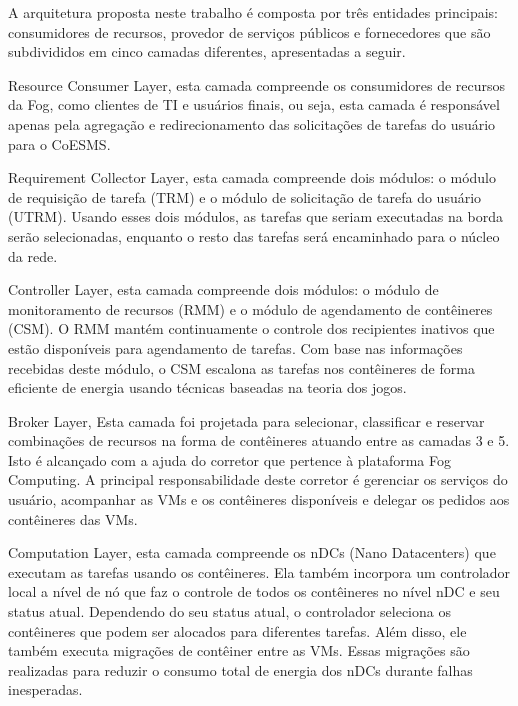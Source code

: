 A arquitetura proposta neste trabalho é composta por três entidades principais: consumidores de recursos, provedor de serviços públicos e fornecedores que são subdivididos em cinco camadas diferentes, apresentadas a seguir.

Resource Consumer Layer, esta camada compreende os consumidores de recursos da Fog, como clientes de TI e usuários finais, ou seja, esta camada é responsável apenas pela agregação e redirecionamento das solicitações de tarefas do usuário para o CoESMS.

Requirement Collector Layer, esta camada compreende dois módulos: o módulo de requisição de tarefa (TRM) e o módulo de solicitação de tarefa do usuário (UTRM). Usando esses dois módulos, as tarefas que seriam executadas na borda serão selecionadas, enquanto o resto das tarefas será encaminhado para o núcleo da rede.

Controller Layer, esta camada compreende dois módulos: o módulo de monitoramento de recursos (RMM) e o módulo de agendamento de contêineres (CSM). O RMM mantém continuamente o controle dos recipientes inativos que estão disponíveis para agendamento de tarefas. Com base nas informações recebidas deste módulo, o CSM escalona as tarefas nos contêineres de forma eficiente de energia usando técnicas baseadas na teoria dos jogos.

Broker Layer, Esta camada foi projetada para selecionar, classificar e reservar combinações de recursos na forma de contêineres atuando entre as camadas 3 e 5. Isto é alcançado com a ajuda do corretor que pertence à plataforma Fog Computing. A principal responsabilidade deste corretor é gerenciar os serviços do usuário, acompanhar as VMs e os contêineres disponíveis e delegar os pedidos aos contêineres das VMs.	

Computation Layer, esta camada compreende os nDCs (Nano Datacenters) que  executam as tarefas usando os contêineres. Ela também incorpora um controlador local a nível de nó que faz o controle de todos os contêineres no nível nDC e seu status atual. Dependendo do seu status atual, o controlador seleciona os contêineres que podem ser alocados para diferentes tarefas. Além disso, ele também executa migrações de contêiner entre as VMs. Essas migrações são realizadas para reduzir o consumo total de energia dos nDCs durante falhas inesperadas.



